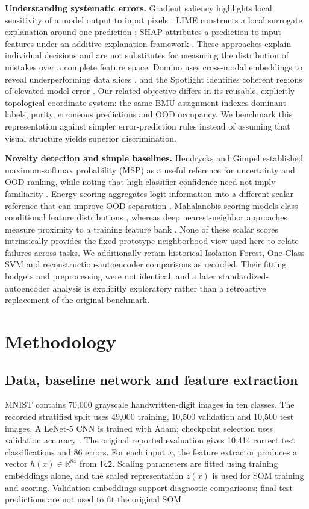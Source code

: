 \documentclass[11pt]{article}
\begin{document}
\textbf{Understanding systematic errors.} Gradient saliency highlights local sensitivity of a model output to input pixels \parencite{simonyan2014saliency}. LIME constructs a local surrogate explanation around one prediction \parencite{ribeiro2016lime}; SHAP attributes a prediction to input features under an additive explanation framework \parencite{lundberg2017shap}. These approaches explain individual decisions and are not substitutes for measuring the distribution of mistakes over a complete feature space. Domino uses cross-modal embeddings to reveal underperforming data slices \parencite{eyuboglu2022domino}, and the Spotlight identifies coherent regions of elevated model error \parencite{deon2022spotlight}. Our related objective differs in its reusable, explicitly topological coordinate system: the same BMU assignment indexes dominant labels, purity, erroneous predictions and OOD occupancy. We benchmark this representation against simpler error-prediction rules instead of assuming that visual structure yields superior discrimination.

\textbf{Novelty detection and simple baselines.} Hendrycks and Gimpel established maximum-softmax probability (MSP) as a useful reference for uncertainty and OOD ranking, while noting that high classifier confidence need not imply familiarity \parencite{hendrycks2017baseline}. Energy scoring aggregates logit information into a different scalar reference that can improve OOD separation \parencite{liu2020energy}. Mahalanobis scoring models class-conditional feature distributions \parencite{lee2018mahalanobis}, whereas deep nearest-neighbor approaches measure proximity to a training feature bank \parencite{sun2022knn}. None of these scalar scores intrinsically provides the fixed prototype-neighborhood view used here to relate failures across tasks. We additionally retain historical Isolation Forest, One-Class SVM and reconstruction-autoencoder comparisons as recorded. Their fitting budgets and preprocessing were not identical, and a later standardized-autoencoder analysis is explicitly exploratory rather than a retroactive replacement of the original benchmark.

\section{Methodology}\label{sec:methods}
\subsection{Data, baseline network and feature extraction}
MNIST contains 70,000 grayscale handwritten-digit images in ten classes. The recorded stratified split uses 49,000 training, 10,500 validation and 10,500 test images. A LeNet-5 CNN is trained with Adam; checkpoint selection uses validation accuracy \parencite{kingma2015adam}. The original reported evaluation gives 10,414 correct test classifications and 86 errors. For each input $x$, the feature extractor produces a vector $h(x)\in\mathbb{R}^{84}$ from \texttt{fc2}. Scaling parameters are fitted using training embeddings alone, and the scaled representation $z(x)$ is used for SOM training and scoring. Validation embeddings support diagnostic comparisons; final test predictions are not used to fit the original SOM.
\end{document}
